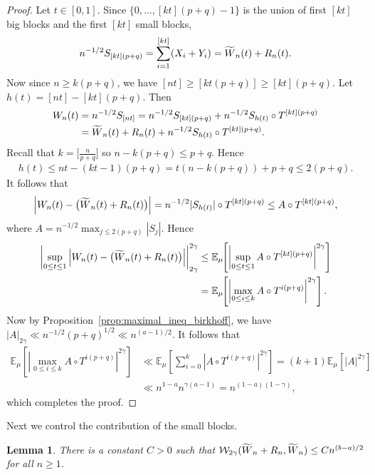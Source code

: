 \documentclass[11pt,a4paper,reqno,oneside]{amsart}
\newcommand{\pnorm}[1]{\left|#1\right|}
\newcommand{\Ex}[2][]{\mathbb{E}_{#1\!\!}\left[#2\right]}
\newcommand{\wass}{\mathcal{W}}
\newcommand{\stilde}[1]{\vphantom{#1}\smash[t]{\widetilde{#1}}}
\newtheorem{lemma}[theorem]{Lemma}
\theoremstyle{definition}
\theoremstyle{remark}
\numberwithin{equation}{section}
\begin{document}
	\begin{proof}
		Let $ t\in [0,1] $. Since $ \{0,\dots,[kt](p+q)-1\} $ is the union of first $ [kt] $ big blocks and the first $ [kt] $ small blocks, 
		\[ n^{-1/2}S_{[kt](p+q)}=\sum_{i=1}^{[kt]}(X_i+Y_i)=\stilde W_n(t)+R_n(t). \]
		Now since $ n\ge k(p+q) $, we have $ [nt]\ge [kt(p+q)]\ge [kt](p+q) $. Let $ h(t)=[nt]-[kt](p+q) $. Then
		\begin{align*}
			W_n(t)&=n^{-1/2}S_{[nt]} = n^{-1/2}S_{[kt](p+q)} + n^{-1/2}S_{h(t)}\circ T^{[kt](p+q)}\\
			&=\stilde W_n(t)+R_n(t)+n^{-1/2}S_{h(t)}\circ T^{[kt](p+q)}.
		\end{align*}
		Recall that $k=\big[\frac{n}{p+q}\big] $ so $ n-k(p+q)\le p+q $. Hence 
		\begin{align*}
			h(t)\le nt - (kt - 1)(p+q)= t(n - k(p+q)) + p + q\le 2(p+q).
		\end{align*}
		It follows that 
		\begin{align*}
			\Big|W_n(t)-\big(\stilde W_n(t)+R_n(t)\big)\Big|= n^{-1/2}|S_{h(t)}|\circ T^{[kt](p+q)}\le A \circ T^{[kt](p+q)},
		\end{align*}
		where $ A=n^{-1/2}\max_{j\le 2(p+q)}|S_j| $. Hence
		\begin{align*}
			\pnorm{\sup_{0\le t\le 1}\Big|W_n(t)-\big(\stilde W_n(t)+R_n(t)\big)\Big|}^{2\gamma}_{2\gamma}&\le \Ex[\mu]{\left|\sup_{0\le t\le 1}A\circ T^{[kt](p+q)}\right|^{2\gamma}}\\
			&=\Ex[\mu]{\left|\max_{0\le i\le k}A\circ T^{i(p+q)}\right|^{2\gamma}}.
		\end{align*}
		Now by Proposition~\ref{prop:maximal_ineq_birkhoff}, we have $ \pnorm{A}_{2\gamma}\ll n^{-1/2}(p+q)^{1/2}\ll n^{(a-1)/2} $. It follows that
		\begin{align*}
			\Ex[\mu]{\left|\max_{0\le i\le k}A\circ T^{i(p+q)}\right|^{2\gamma}}&\ll \Ex[\mu]{\sum_{i=0}^{k}|A\circ T^{i(p+q)}|^{2\gamma}}=(k+1)\Ex[\mu]{|A|^{2\gamma}}\\
			&\ll n^{1-a}n^{\gamma(a-1)}=n^{(1-a)(1-\gamma)},
		\end{align*}
		which completes the proof.
	\end{proof}
Next we control the contribution of the small blocks.
\begin{lemma}\label{lem:small_blocks_negligible}
	There is a constant $C>0$ such that $\wass_{2\gamma}(\stilde W_n+R_n, \stilde W_n)\le Cn^{(b-a)/2}$ for all $n\ge 1$.
\end{lemma}
\end{document}
